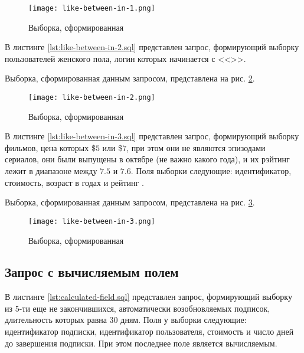\begin{figure}[H]
	\centering
	\texttt{[image: like-between-in-1.png]}
	\caption{Выборка, сформированная }
	\label{fig:like-between-in-1}
\end{figure}
 

В листинге \ref{lst:like-between-in-2.sql} представлен запрос, формирующий выборку пользователей женского пола, логин которых начинается с <<>>.



Выборка, сформированная данным запросом, представлена на рис. \ref{fig:like-between-in-2}.

\begin{figure}[H]
	\centering
	\texttt{[image: like-between-in-2.png]}
	\caption{Выборка, сформированная }
	\label{fig:like-between-in-2}
\end{figure}

В листинге \ref{lst:like-between-in-3.sql} представлен запрос, формирующий выборку фильмов, цена которых \$$5$ или \$$7$, при этом они не являются эпизодами сериалов, они были выпущены в октябре (не важно какого года), и их  рэйтинг лежит в диапазоне между $7.5$ и $7.6$. Поля выборки следующие: идентификатор, стоимость, возраст в годах и рейтинг .



Выборка, сформированная данным запросом, представлена на рис. \ref{fig:like-between-in-3}.

\begin{figure}[H]
	\centering
	\texttt{[image: like-between-in-3.png]}
	\caption{Выборка, сформированная }
	\label{fig:like-between-in-3}
\end{figure}

\subsection{Запрос с вычисляемым полем}

В листинге \ref{lst:calculated-field.sql} представлен запрос, формирующий выборку из 5-ти еще не закончившихся, автоматически возобновляемых подписок, длительность которых равна 30 дням. Поля у выборки следующие: идентификатор подписки, идентификатор пользователя, стоимость и число дней до завершения подписки. При этом последнее поле является вычисляемым.

